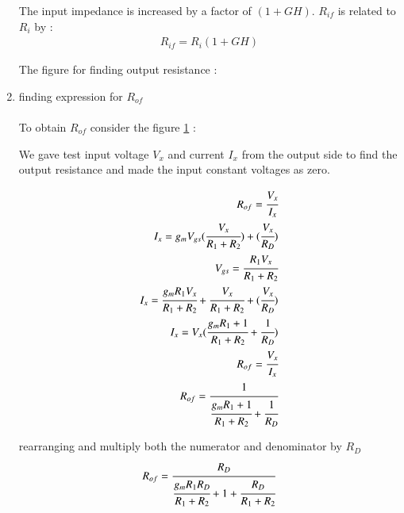 \begin{enumerate}[label=\thesubsection.\arabic*.,ref=\thesubsection.\theenumi]
The input impedance is increased by a factor of $(1+GH)$.
$R_{if}$ is related to $R_{i}$ by :\\
\begin{align}
R_{if} = R_{i}(1 + GH)
\end{align}




The figure for finding output resistance :

\begin{figure}[ht!]
	\begin{center}
		\resizebox{\columnwidth}{!}{}
	\end{center}
	\caption{}
	\label{fig:Small signal for finding output resistance}
\end{figure}

\item finding expression for $R_{of}$\\
\solution\\

To obtain $R_{of}$ consider the figure \ref{fig:Small signal for finding output resistance} :



We gave test input voltage $V_{x}$ and current $I_{x}$ from the output side to find the output resistance and made the input constant voltages as zero.

\begin{align}
R_{of} = \cfrac{V_{x}}{I_{x}}\\
I_{x} = g_{m}V_{gs}(\cfrac{V_{x}}{R_{1}+R_{2}})+(\cfrac{V_{x}}{R_{D}})\\
V_{gs} = \cfrac{R_{1}V_{x}}{R_{1}+R_{2}}\\
I_{x} = \cfrac{g_{m}R_{1}V_{x}}{R_{1}+R_{2}}+\cfrac{V_{x}}{R_{1}+R_{2}}+(\cfrac{V_{x}}{R_{D}})\\
I_{x} = V_{x}(\cfrac{g_{m}R_{1}+1}{R_{1}+R_{2}} + \cfrac{1}{R_{D}})\\
R_{of} = \cfrac{V_{x}}{I_{x}}\\ R_{of} = \cfrac{1}{\cfrac{g_{m}R_{1}+1}{R_{1}+R_{2}}+\cfrac{1}{R_{D}}}
\end{align}



rearranging and multiply both the numerator and denominator by $R_{D}$\\

\begin{align}
R_{of} = \cfrac{R_{D}}{\cfrac{g_{m}R_{1}R_{D}}{R_{1}+R_{2}}+1+\cfrac{R_{D}}{R_{1}+R_{2}}}
\end{align}


\end{enumerate}
